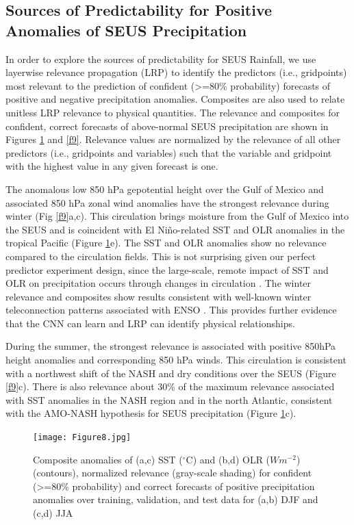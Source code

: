 \documentclass{ametsocV6.1}
\begin{document}
\subsection{Sources of Predictability for Positive Anomalies of SEUS Precipitation}
\label{sec:resultspos}

In order to explore the sources of predictability for SEUS Rainfall, we use layerwise relevance propagation (LRP) to identify the predictors (i.e., gridpoints) most relevant to the prediction of confident (>=80\% probability) forecasts of positive and negative precipitation anomalies. Composites are also used to relate unitless LRP relevance to physical quantities. The relevance and composites for confident, correct forecasts of above-normal SEUS precipitation are shown in Figures \ref{f8} and \ref{f9}. Relevance values are normalized by the relevance of all other predictors (i.e., gridpoints and variables) such that the variable and gridpoint with the highest value in any given forecast is one. 

The anomalous low 850 hPa gepotential height over the Gulf of Mexico and associated 850 hPa zonal wind anomalies have the strongest relevance during winter (Fig \ref{f9}a,c).  This circulation brings moisture from the Gulf of Mexico into the SEUS and is  coincident with El Ni\~{n}o-related SST and OLR anomalies in the tropical Pacific (Figure \ref{f8}e). The SST and OLR anomalies show no relevance compared to the circulation fields.  This is not surprising given our perfect predictor experiment design, since the large-scale, remote impact of SST and OLR on precipitation occurs through changes in circulation \citep[e.g.,][]{ropelewski_north_1986}.  The winter relevance and composites show results consistent with well-known winter teleconnection patterns associated with ENSO \citep[e.g.,][]{ropelewski_north_1986}. This provides further evidence that the CNN can learn and LRP can identify physical relationships. 

During the summer, the strongest relevance is associated with positive 850hPa height anomalies and corresponding 850 hPa winds.  This circulation is consistent with a northwest shift of the NASH and dry conditions over the SEUS (Figure \ref{f9}c). There is also relevance about 30\% of the maximum relevance associated with SST anomalies in the NASH region and in the north Atlantic, consistent with the AMO-NASH hypothesis for SEUS precipitation (Figure \ref{f8}c).

\begin{figure}[t]
  \noindent\texttt{[image: Figure8.jpg]}
  \caption{Composite anomalies of (a,c) SST ($^\circ$C) and (b,d) OLR ($Wm^{-2}$) (contours), normalized relevance (gray-scale shading) for confident (>=80\% probability) and correct forecasts of positive precipitation anomalies over training, validation, and test data for (a,b) DJF and (c,d) JJA}\label{f8}
\end{figure}
\end{document}
